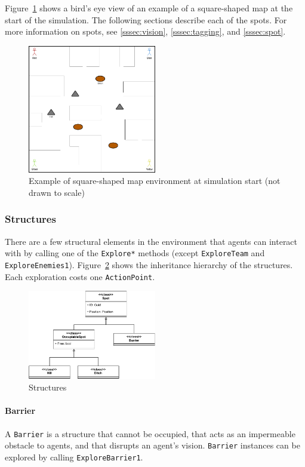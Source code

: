 \documentclass[
  a4paper,
  english,
  DIV=16,
  11pt,
  parskip=half,
  dvipsnames,
  listof=totoc,		     %
  index=totoc,		     %
  bibliography=totoc,	 %
]{scrartcl}
\begin{document}
Figure~\ref{fig:envEx} shows a bird's eye view of an example of a square-shaped map at the start of the simulation. The following sections describe each of the spots. For more information on spots, see \ref{sssec:vision}, \ref{sssec:tagging}, and \ref{sssec:spot}.
%
\begin{figure}[H]
  \centering
  \includegraphics[width=0.5\textwidth, height=0.5\textheight,keepaspectratio]{img/ExampleGameWorldAtSimStart.png}
  \caption{Example of square-shaped map environment at simulation start (not drawn to scale)}
  \label{fig:envEx}
\end{figure}
%
\subsubsection{Structures} \label{sssec:struc}
There are a few structural elements in the environment that agents can interact with by calling one of the \texttt{Explore*} methods (except \texttt{ExploreTeam} and \texttt{ExploreEnemies1}). Figure~\ref*{fig:structures} shows the inheritance hierarchy of the structures. Each exploration costs one \texttt{ActionPoint}.
%
\begin{figure}[H]
    \centering
    \includegraphics[width=0.5\textwidth, height=0.5\textheight,keepaspectratio]{img/lasertag-env-comps.pdf}
    \caption{Structures}
    \label{fig:structures}
\end{figure}
%
\paragraph{Barrier} \label{par:barrierDesc}
A \texttt{Barrier} is a structure that cannot be occupied, that acts as an impermeable obstacle to agents, and that disrupts an agent's vision. \texttt{Barrier} instances can be explored by calling \texttt{ExploreBarrier1}.
%
\end{document}
